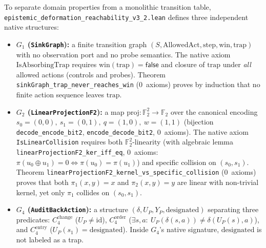 \documentclass[10pt,a4paper]{article}
\theoremstyle{cleanthm}
\theoremstyle{cleandef}
\begin{document}
To separate domain properties from a monolithic transition table, \texttt{epistemic\_\allowbreak deformation\_\allowbreak reachability\_\allowbreak v3\_\allowbreak 2.lean} defines three independent native structures:
\begin{itemize}
  \item \textbf{$G_1$ (\texttt{SinkGraph}):} a finite transition graph $(S,\mathrm{AllowedAct},\mathrm{step},\mathrm{win},\mathrm{trap})$ with no observation port and no probe semantics. The native axiom $\mathrm{IsAbsorbingTrap}$ requires $\mathrm{win}(\mathrm{trap})=\mathsf{false}$ and closure of $\mathrm{trap}$ under \emph{all} allowed actions (controls and probes). Theorem \texttt{sinkGraph\_\allowbreak trap\_\allowbreak never\_\allowbreak reaches\_\allowbreak win} (0~axioms) proves by induction that no finite action sequence leaves $\mathrm{trap}$.
  \item \textbf{$G_2$ (\texttt{LinearProjectionF2}):} a map $\mathrm{proj}:\mathbb{F}_2^2\to\mathbb{F}_2$ over the canonical encoding $s_0=(0,0),\ s_1=(0,1),\ q=(1,0),\ w=(1,1)$ (bijection \texttt{decode\_\allowbreak encode\_\allowbreak bit2}, \texttt{encode\_\allowbreak decode\_\allowbreak bit2}, 0~axioms). The native axiom \texttt{IsLinearCollision} requires both $\mathbb{F}_2^2$-linearity (with algebraic lemma \texttt{linearProjectionF2\_\allowbreak ker\_\allowbreak iff\_\allowbreak eq}, 0~axioms: $\pi(u_0\oplus u_1)=0\iff\pi(u_0)=\pi(u_1)$) and specific collision on $(s_0,s_1)$. Theorem \texttt{linearProjectionF2\_\allowbreak kernel\_\allowbreak vs\_\allowbreak specific\_\allowbreak collision} (0~axioms) proves that both $\pi_1(x,y)=x$ and $\pi_2(x,y)=y$ are linear with non-trivial kernel, yet only $\pi_1$ collides on $(s_0,s_1)$.
  \item \textbf{$G_4$ (\texttt{AuditBackAction}):} a structure $(\delta,U_P,Y_P,\mathrm{designated})$ separating three predicates: $C_4^{\mathrm{change}}$ ($U_P\ne\mathrm{id}$), $C_4^{\mathrm{order}}$ ($\exists s,a:\ U_P(\delta(s,a))\ne\delta(U_P(s),a)$), and $C_4^{\mathrm{entry}}$ ($U_P(s_1)=\mathrm{designated}$). Inside $G_4$'s native signature, $\mathrm{designated}$ is not labeled as a trap.
\end{itemize}
\end{document}
